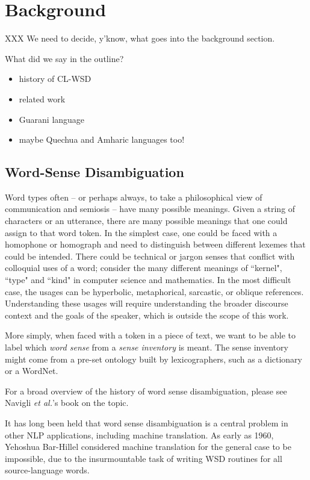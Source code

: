 \chapter{Background}
\label{chap:background}

XXX We need to decide, y'know, what goes into the background section.

What did we say in the outline?

\begin{itemize}
\item history of CL-WSD
\item related work
\item Guarani language
\item maybe Quechua and Amharic languages too!
\end{itemize}

\section{Word-Sense Disambiguation}

Word types often -- or perhaps always, to take a philosophical view of 
communication and semiosis -- have many possible meanings. Given a string of
characters or an utterance, there are many possible meanings that one
could assign to that word token. In the simplest case, one could be faced with
a homophone or homograph and need to distinguish between different lexemes that
could be intended. There could be technical or jargon senses that conflict with
colloquial uses of a word; consider the many different meanings of ``kernel",
``type" and ``kind" in computer science and mathematics. In the most difficult
case, the usages can be hyperbolic, metaphorical, sarcastic, or oblique
references. Understanding these usages will require understanding the broader
discourse context and the goals of the speaker, which is outside the scope of
this work.

More simply, when faced with a token in a piece of text, we want to be able to
label which \emph{word sense} from a \emph{sense inventory} is meant. The sense
inventory might come from a pre-set ontology built by lexicographers, such as a
dictionary or a WordNet.

For a broad overview of the history of word sense disambiguation, please see
Navigli \emph{et al.}'s book on the topic. \cite{wsdbook}


It has long been held that word sense disambiguation is a central problem in
other NLP applications, including machine translation. As early as 1960,
Yehoshua Bar-Hillel considered machine translation for the general case to be
impossible, due to the insurmountable task of writing WSD routines for all
source-language words. \cite{barhillel1960}

